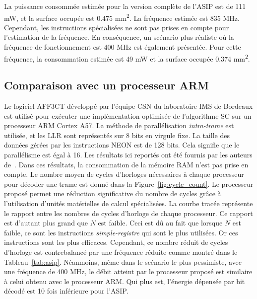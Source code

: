 La puissance consommée estimée pour la version complète de l'ASIP est de 111 mW, et la surface occupée est 0.475 mm\textsuperscript{2}. La fréquence estimée est 835 MHz. Cependant, les instructions spécialisées ne sont pas prises en compte pour l'estimation de la fréquence. En conséquence, un scénario plus réaliste où la fréquence de fonctionnement est 400 MHz est également présentée. Pour cette fréquence, la consommation estimée est 49 mW et la surface occupée 0.374 mm\textsuperscript{2}.

\subsection{Comparaison avec un processeur ARM}

Le logiciel AFF3CT développé par l'équipe CSN du laboratoire IMS de Bordeaux est utilisé pour exécuter une implémentation optimisée de l'algorithme SC sur un processeur ARM Cortex A57. La méthode de parallélisation \textit{intra-trame} est utilisée, et les LLR sont représentés sur 8 bits en virgule fixe. La taille des données gérées par les instructions NEON est de 128 bits. Cela signifie que le parallélisme est égal à 16. Les résultats ici reportés ont été fournis par les auteurs de~\cite{cassagne_energy_2016}. Dans ces résultats, la consommation de la mémoire RAM n'est pas prise en compte.
Le nombre moyen de cycles d'horloges nécessaires à chaque processeur pour décoder une trame est donné dans la Figure~\ref{fig:cycle_count}. Le processeur proposé permet une réduction significative du nombre de cycles grâce à l'utilisation d'unités matérielles de calcul spécialisées. La courbe tracée représente le rapport entre les nombres de cycles d'horloge de chaque processeur. Ce rapport est d'autant plus grand que $N$ est faible. Ceci est dû au fait que lorsque $N$ est faible, ce sont les instructions \textit{simple-registre} qui sont le plus utilisées. Or ces instructions sont les plus efficaces.
Cependant, ce nombre réduit de cycles d'horloge est contrebalancé par une fréquence réduite comme montré dans le Tableau~\ref{tab:asip}. Néanmoins, même dans le scénario le plus pessimiste, avec une fréquence de 400 MHz, le débit atteint par le processeur proposé est similaire à celui obtenu avec le processeur ARM. Qui plus est, l'énergie dépensée par bit décodé est 10 fois inférieure pour l'ASIP.
